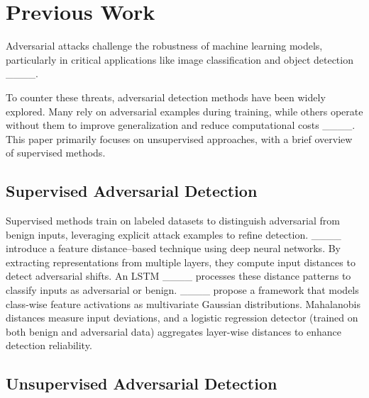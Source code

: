 \section{Previous Work}
\label{sec:previous_work}

Adversarial attacks challenge the robustness of machine learning models, particularly in critical applications like image classification and object detection ____.

To counter these threats, adversarial detection methods have been widely explored. Many rely on adversarial examples during training, while others operate without them to improve generalization and reduce computational costs ____. This paper primarily focuses on unsupervised approaches, with a brief overview of supervised methods.

\subsection{Supervised Adversarial Detection}
\label{subsec:previous_supervised}

Supervised methods train on labeled datasets to distinguish adversarial from benign inputs, leveraging explicit attack examples to refine detection.  ____ introduce a feature distance–based technique using deep neural networks. By extracting representations from multiple layers, they compute input distances to detect adversarial shifts. An LSTM ____ processes these distance patterns to classify inputs as adversarial or benign. ____ propose a framework that models class-wise feature activations as multivariate Gaussian distributions. Mahalanobis distances measure input deviations, and a logistic regression detector (trained on both benign and adversarial data) aggregates layer-wise distances to enhance detection reliability.

\subsection{Unsupervised Adversarial Detection}
\label{subsec:previous_unsupervised}

